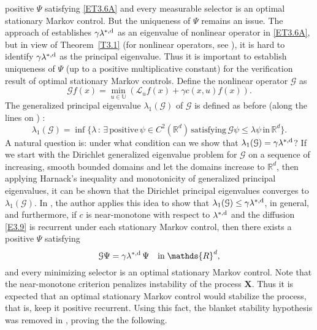 \documentclass[notitlepage,11pt,reqno]{amsart}
\numberwithin{equation}{section}
\theoremstyle{plain}
\theoremstyle{definition}
\theoremstyle{remark}
\newcommand{\Act}{{\mathds{U}}}
\newcommand{\cG}{{\mathcal{G}}}     %
\newcommand{\sL}{{\mathscr{L}}}
\newcommand{\lamstrdf}{\lambda^{*,{\rm d}}}
\newcommand{\Rd}{{\mathds{R}^{d}}}
\begin{document}
positive $\Psi$ satisfying \eqref{ET3.6A} and every measurable selector 
is an optimal stationary Markov control. But the uniqueness 
of $\Psi$ remains an issue.
The approach of \cite{MR2174017,MR2679473} establishes 
$\gamma\lamstrdf$ as an eigenvalue of nonlinear operator in \eqref{ET3.6A}, but in view of Theorem~\ref{T3.1} (for nonlinear operators, see
\cite[Theorem~2.1]{BR2022}), it is hard to
identify $\gamma\lamstrdf$ as the principal eigenvalue. Thus it is important to establish uniqueness of $\Psi$ (up to a positive multiplicative constant)  for the verification 
result of optimal stationary Markov controls. Define the 
nonlinear operator $\cG$ as
\begin{equation}\label{EG}
\cG f (x) = \min_{u\in\Act}(\sL_u f(x) + \gamma c(x, u) f(x)).
\end{equation}
The generalized principal eigenvalue $\lambda_1(\cG)$
 of $\cG$ is defined as before (along the
lines on \cite{MR3340379,BR2022}) :
$$
\lambda_{1}(\cG)=\inf\{\lambda\, :\, \exists\, \text{positive}\, \psi\in C^2(\Rd)\, \text{satisfying} \, \cG\psi\leq \lambda\psi\, \text{in}\, \Rd \}.
$$
A natural question is: under what condition can we show that
$\lambda_1(\cG)=\gamma\lamstrdf$? If we start with the 
Dirichlet generalized eigenvalue problem for $\cG$ on a sequence of
increasing, smooth bounded domains
and let the domains increase to $\Rd$, then applying Harnack's inequality and monotonicity of generalized principal eigenvalues,
it can be shown that the Dirichlet principal eigenvalues converges to 
$\lambda_1(\cG)$. In \cite{MR2808061}, the author applies this idea to
show that $\lambda_1(\cG)\leq \gamma\lamstrdf$, in general, and furthermore,
if $c$ is near-monotone with respect to $\lamstrdf$ and the diffusion \eqref{E3.9} is
recurrent under each stationary Markov control, then there exists a 
positive $\Psi$ satisfying 
$$\cG\Psi=\gamma\lamstrdf\,\Psi\quad \text{in}\; \Rd,$$
 and every minimizing selector 
is an optimal stationary Markov control. Note that the near-monotone criterion penalizes  instability of the process $\textbf{X}$. Thus it is expected that an optimal stationary Markov control would stabilize the process, 
that is, keep it  positive recurrent. Using this fact, the blanket stability hypothesis was removed in \cite{MR3780687}, proving the the following.
\end{document}
